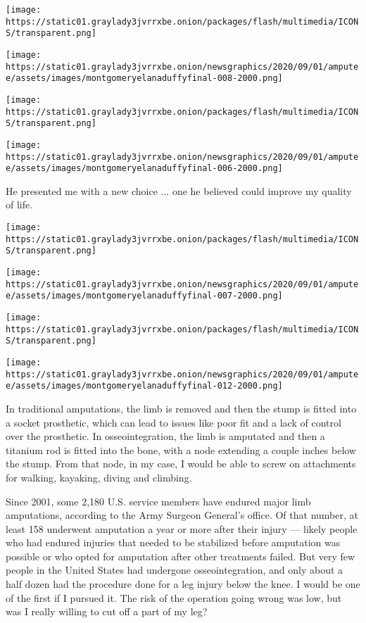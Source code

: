 \texttt{[image: https://static01.graylady3jvrrxbe.onion/packages/flash/multimedia/ICONS/transparent.png]}

\texttt{[image: https://static01.graylady3jvrrxbe.onion/newsgraphics/2020/09/01/amputee/assets/images/montgomeryelanaduffyfinal-008-2000.png]}

\texttt{[image: https://static01.graylady3jvrrxbe.onion/packages/flash/multimedia/ICONS/transparent.png]}

\texttt{[image: https://static01.graylady3jvrrxbe.onion/newsgraphics/2020/09/01/amputee/assets/images/montgomeryelanaduffyfinal-006-2000.png]}

He presented me with a new choice ... one he believed could improve my
quality of life.

\texttt{[image: https://static01.graylady3jvrrxbe.onion/packages/flash/multimedia/ICONS/transparent.png]}

\texttt{[image: https://static01.graylady3jvrrxbe.onion/newsgraphics/2020/09/01/amputee/assets/images/montgomeryelanaduffyfinal-007-2000.png]}

\texttt{[image: https://static01.graylady3jvrrxbe.onion/packages/flash/multimedia/ICONS/transparent.png]}

\texttt{[image: https://static01.graylady3jvrrxbe.onion/newsgraphics/2020/09/01/amputee/assets/images/montgomeryelanaduffyfinal-012-2000.png]}

In traditional amputations, the limb is removed and then the stump is
fitted into a socket prosthetic, which can lead to issues like poor fit
and a lack of control over the prosthetic. In osseointegration, the limb
is amputated and then a titanium rod is fitted into the bone, with a
node extending a couple inches below the stump. From that node, in my
case, I would be able to screw on attachments for walking, kayaking,
diving and climbing.

Since 2001, some 2,180 U.S. service members have endured major limb
amputations, according to the Army Surgeon General's office. Of that
number, at least 158 underwent amputation a year or more after their
injury --- likely people who had endured injuries that needed to be
stabilized before amputation was possible or who opted for amputation
after other treatments failed. But very few people in the United States
had undergone osseointegration, and only about a half dozen had the
procedure done for a leg injury below the knee. I would be one of the
first if I pursued it. The risk of the operation going wrong was low,
but was I really willing to cut off a part of my leg?

